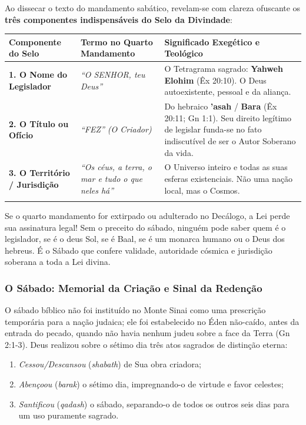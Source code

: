 Ao dissecar o texto do mandamento sabático, revelam-se com clareza ofuscante os \textbf{três componentes indispensáveis do Selo da Divindade}:


\begin{table}[htbp]
\centering
\footnotesize
\setlength{\tabcolsep}{5pt}
\renewcommand{\arraystretch}{1.25}
\begin{tabularx}{\textwidth}{>{\raggedright\arraybackslash}p{} >{\raggedright\arraybackslash}X >{\raggedright\arraybackslash}X}
\toprule
\textbf{Componente do Selo} & \textbf{Termo no Quarto Mandamento} & \textbf{Significado Exegético e Teológico} \\
\midrule
\textbf{1. O Nome do Legislador} & \textit{``O SENHOR, teu Deus''} & O Tetragrama sagrado: \textbf{Yahweh Elohim} (Êx 20:10). O Deus autoexistente, pessoal e da aliança. \\
\addlinespace[3pt]
\textbf{2. O Título ou Ofício} & \textit{``FEZ'' (O Criador)} & Do hebraico \textbf{'asah} / \textbf{Bara} (Êx 20:11; Gn 1:1). Seu direito legítimo de legislar funda-se no fato indiscutível de ser o Autor Soberano da vida. \\
\addlinespace[3pt]
\textbf{3. O Território / Jurisdição} & \textit{``Os céus, a terra, o mar e tudo o que neles há''} & O Universo inteiro e todas as suas esferas existenciais. Não uma nação local, mas o Cosmos. \\
\addlinespace[3pt]
\bottomrule
\end{tabularx}
\end{table}


Se o quarto mandamento for extirpado ou adulterado no Decálogo, a Lei perde sua assinatura legal! Sem o preceito do sábado, ninguém pode saber quem é o legislador, se é o deus Sol, se é Baal, se é um monarca humano ou o Deus dos hebreus. É o Sábado que confere validade, autoridade cósmica e jurisdição soberana a toda a Lei divina.


\subsubsection*{O Sábado: Memorial da Criação e Sinal da Redenção}


O sábado bíblico não foi instituído no Monte Sinai como uma prescrição temporária para a nação judaica; ele foi estabelecido no Éden não-caído, antes da entrada do pecado, quando não havia nenhum judeu sobre a face da Terra (Gn 2:1-3). Deus realizou sobre o sétimo dia três atos sagrados de distinção eterna:
\begin{enumerate}
  \item \textit{Cessou/Descansou} (\textit{shabath}) de Sua obra criadora;
  \item \textit{Abençoou} (\textit{barak}) o sétimo dia, impregnando-o de virtude e favor celestes;
  \item \textit{Santificou} (\textit{qadash}) o sábado, separando-o de todos os outros seis dias para um uso puramente sagrado.
\end{enumerate}


